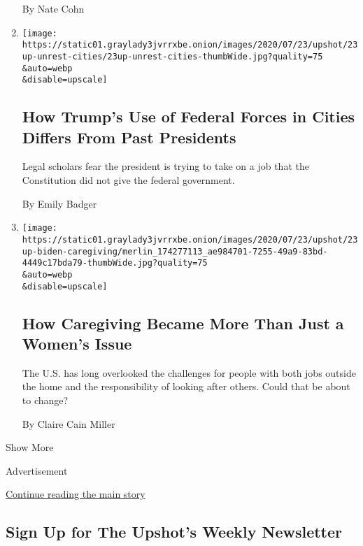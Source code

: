 \begin{enumerate}
  By Nate Cohn
\item
  \href{/2020/07/23/upshot/trump-portland.html}{}

  \texttt{[image: https://static01.graylady3jvrrxbe.onion/images/2020/07/23/upshot/23up-unrest-cities/23up-unrest-cities-thumbWide.jpg?quality=75\\\&auto=webp\\\&disable=upscale]}

  \hypertarget{how-trumps-use-of-federal-forces-in-cities-differs-from-past-presidents}{%
  \subsection{How Trump's Use of Federal Forces in Cities Differs From
  Past
  Presidents}\label{how-trumps-use-of-federal-forces-in-cities-differs-from-past-presidents}}

  Legal scholars fear the president is trying to take on a job that the
  Constitution did not give the federal government.

  By Emily Badger
\item
  \href{/2020/07/23/upshot/biden-caregiving-plan.html}{}

  \texttt{[image: https://static01.graylady3jvrrxbe.onion/images/2020/07/23/upshot/23up-biden-caregiving/merlin\_174277113\_ae984701-7255-49a9-83bd-4449c17bda79-thumbWide.jpg?quality=75\\\&auto=webp\\\&disable=upscale]}

  \hypertarget{how-caregiving-became-more-than-just-a-womens-issue}{%
  \subsection{How Caregiving Became More Than Just a Women's
  Issue}\label{how-caregiving-became-more-than-just-a-womens-issue}}

  The U.S. has long overlooked the challenges for people with both jobs
  outside the home and the responsibility of looking after others. Could
  that be about to change?

  By Claire Cain Miller
\end{enumerate}

Show More

Advertisement

\protect\hyperlink{after-mid2}{Continue reading the main story}

\hypertarget{sign-up-for-the-upshots-weekly-newsletter}{%
\subsection{Sign Up for The Upshot's Weekly
Newsletter}\label{sign-up-for-the-upshots-weekly-newsletter}}

